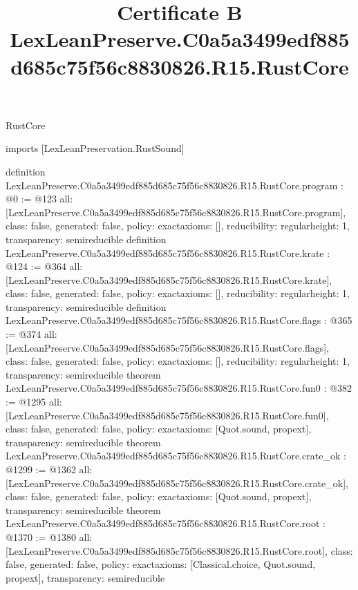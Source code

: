 \begin{lexlean}{RustCore}
\title{Certificate B LexLeanPreserve.C0a5a3499edf885d685c75f56c8830826.R15.RustCore}
\begin{coremodule}
imports [LexLeanPreservation.RustSound]

definition LexLeanPreserve.C0a5a3499edf885d685c75f56c8830826.R15.RustCore.program : @0 := @123 {
  all: [LexLeanPreserve.C0a5a3499edf885d685c75f56c8830826.R15.RustCore.program],
  class: false,
  generated: false,
  policy: exact{axioms: []},
  reducibility: regular{height: 1},
  transparency: semireducible
}
definition LexLeanPreserve.C0a5a3499edf885d685c75f56c8830826.R15.RustCore.krate : @124 := @364 {
  all: [LexLeanPreserve.C0a5a3499edf885d685c75f56c8830826.R15.RustCore.krate],
  class: false,
  generated: false,
  policy: exact{axioms: []},
  reducibility: regular{height: 1},
  transparency: semireducible
}
definition LexLeanPreserve.C0a5a3499edf885d685c75f56c8830826.R15.RustCore.flags : @365 := @374 {
  all: [LexLeanPreserve.C0a5a3499edf885d685c75f56c8830826.R15.RustCore.flags],
  class: false,
  generated: false,
  policy: exact{axioms: []},
  reducibility: regular{height: 1},
  transparency: semireducible
}
theorem LexLeanPreserve.C0a5a3499edf885d685c75f56c8830826.R15.RustCore.fun0 : @382 := @1295 {
  all: [LexLeanPreserve.C0a5a3499edf885d685c75f56c8830826.R15.RustCore.fun0],
  class: false,
  generated: false,
  policy: exact{axioms: [Quot.sound, propext]},
  transparency: semireducible
}
theorem LexLeanPreserve.C0a5a3499edf885d685c75f56c8830826.R15.RustCore.crate_ok : @1299 := @1362 {
  all: [LexLeanPreserve.C0a5a3499edf885d685c75f56c8830826.R15.RustCore.crate_ok],
  class: false,
  generated: false,
  policy: exact{axioms: [Quot.sound, propext]},
  transparency: semireducible
}
theorem LexLeanPreserve.C0a5a3499edf885d685c75f56c8830826.R15.RustCore.root : @1370 := @1380 {
  all: [LexLeanPreserve.C0a5a3499edf885d685c75f56c8830826.R15.RustCore.root],
  class: false,
  generated: false,
  policy: exact{axioms: [Classical.choice, Quot.sound, propext]},
  transparency: semireducible
}


\end{coremodule}
\end{lexlean}

